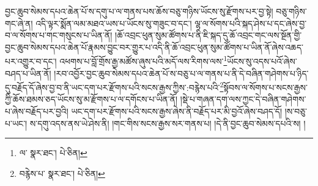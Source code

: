 བྱང་ཆུབ་སེམས་དཔའ་ཆེན་པོ་ས་དགུ་པ་ལ་གནས་པས་ཆོས་བཅུ་གཉིས་ཡོངས་སུ་རྫོགས་པར་བྱ་སྟེ། བཅུ་གཉིས་གང་ཞེ་ན། འདི་ལྟར་སྨོན་ལམ་མཐའ་ཡས་པ་ཡོངས་སུ་གཟུང་བ་དང་། ལྷ་ལ་སོགས་པའི་སྐད་ཤེས་པ་དང་ཞེས་བྱ་བ་ལ་སོགས་པ་གང་གསུངས་པ་ཡིན་ནོ། །ཆོ་འབྲང་ཕུན་སུམ་ཚོགས་པ་ནི་ཇི་སྐད་དུ་ཆོ་འབྲང་གང་ལས་སྔོན་གྱི་བྱང་ཆུབ་སེམས་དཔའ་ཆེན་པོ་རྣམས་བྱུང་བར་གྱུར་པ་འདི་ནི་ཆོ་འབྲང་ཕུན་སུམ་ཚོགས་པ་ཡིན་ནོ་ཞེས་འཆད་པར་འགྱུར་བ་དང་། འཕགས་པ་བློ་གྲོས་རྒྱ་མཚོས་ཞུས་པའི་མདོ་ལས་རིགས་ལས་\footnote{ལ་  སྣར་ཐང་།  པེ་ཅིན། }ཡོངས་སུ་འདས་པའོ་ཞེས་བཤད་པ་ཡིན་ནོ། །རབ་འབྱོར་བྱང་ཆུབ་སེམས་དཔའ་ཆེན་པོ་ས་བཅུ་པ་ལ་གནས་པ་ནི་དེ་བཞིན་གཤེགས་པ་ཉིད་དུ་བརྗོད་དོ་ཞེས་བྱ་བ་ནི་ཡང་དག་པར་རྫོགས་པའི་སངས་རྒྱས་ཀྱིས་:བརྙེས་པའི་\footnote{བརྙེས་པ་  སྣར་ཐང་།  པེ་ཅིན། }སྟོབས་ལ་སོགས་པ་སངས་རྒྱས་ཀྱི་ཆོས་ཐམས་ཅད་ཡོངས་སུ་མ་རྫོགས་པ་ལ་དགོངས་པ་ཡིན་ནོ། །སྡེ་པ་གཞན་དག་ལས་ཀྱང་དེ་བཞིན་གཤེགས་པ་ཞེས་བརྗོད་པར་བྱའི། ཡང་དག་པར་རྫོགས་པའི་སངས་རྒྱས་ཞེས་ནི་བརྗོད་པར་མི་བྱའོ་ཞེས་བཤད་དོ། །ས་བཅུ་པ་ཡང་། ས་དགུ་འདས་ནས་ཡེ་ཤེས་ནི། །གང་གིས་སངས་རྒྱས་སར་གནས་པ། །དེ་ནི་བྱང་ཆུབ་སེམས་དཔའི་ས། །
